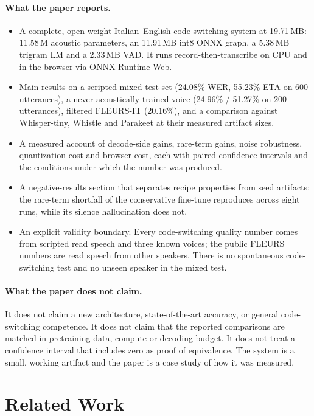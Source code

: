 \documentclass{article}
\begin{document}
\paragraph{What the paper reports.}
\begin{itemize}
  \item A complete, open-weight Italian--English code-switching system at 19.71\,MB: 11.58\,M
        acoustic parameters, an 11.91\,MB int8 ONNX graph, a 5.38\,MB trigram LM and a 2.33\,MB
        VAD. It runs record-then-transcribe on CPU and in the browser via ONNX Runtime Web.
  \item Main results on a scripted mixed test set (24.08\% WER, 55.23\% ETA on 600 utterances),
        a never-acoustically-trained voice (24.96\% / 51.27\% on 200 utterances), filtered
        FLEURS-IT (20.16\%), and a comparison against Whisper-tiny, Whistle and Parakeet at
        their measured artifact sizes.
  \item A measured account of decode-side gains, rare-term gains, noise robustness,
        quantization cost and browser cost, each with paired confidence intervals and the
        conditions under which the number was produced.
  \item A negative-results section that separates recipe properties from seed artifacts: the
        rare-term shortfall of the conservative fine-tune reproduces across eight runs, while
        its silence hallucination does not.
  \item An explicit validity boundary. Every code-switching quality number comes from scripted
        read speech and three known voices; the public FLEURS numbers are read speech from other
        speakers. There is no spontaneous code-switching test and no unseen speaker in the mixed
        test.
\end{itemize}

\paragraph{What the paper does not claim.}
It does not claim a new architecture, state-of-the-art accuracy, or general code-switching
competence. It does not claim that the reported comparisons are matched in pretraining data,
compute or decoding budget. It does not treat a confidence interval that includes zero as proof
of equivalence. The system is a small, working artifact and the paper is a case study of how it
was measured.

\section{Related Work}
\end{document}
